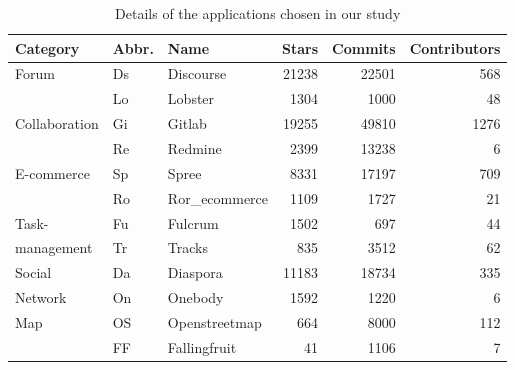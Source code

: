 \begin{table}
\begin{center}

\footnotesize{
  \caption{Details of the applications chosen in our study}
  \label{tab:apps}
  \begin{tabular}{lllrrr}
  \toprule
  	{Category}&{Abbr.}&{Name}&{Stars}&{Commits}&{Contributors}\\
  \midrule
	\multirow{2}{*}{Forum}&Ds&Discourse&21238&22501&568\\
  \cmidrule{2-6}
  &Lo& Lobster &1304 &1000 &48\\
  \midrule
  \multirow{2}{*}{Collaboration} &Gi&Gitlab &19255 &49810 &1276\\
  \cmidrule{2-6}
  &Re& Redmine &2399 &13238 &6\\
  \midrule
  \multirow{2}{*}{E-commerce}& Sp&Spree &8331 &17197 &709\\
  \cmidrule{2-6}
  &Ro& {Ror\_ecommerce} &1109 &1727 &21\\
  \midrule
 Task-& Fu& Fulcrum &1502 &697 &44\\
  \cmidrule{2-6}
 management &Tr& Tracks &835 &3512 &62\\
  \midrule
  {Social}& Da&Diaspora &11183 &18734 &335\\
  \cmidrule{2-6}
   Network& On&Onebody &1592 &1220 &6\\
  \midrule
 \multirow{2}{*}{ Map}
  &OS& {Openstreetmap} &664 &8000 &112\\
  \cmidrule{2-6}
  &FF& Fallingfruit &41 &1106 &7\\
 \bottomrule

\end{tabular}
}

\end{center}
\end{table}